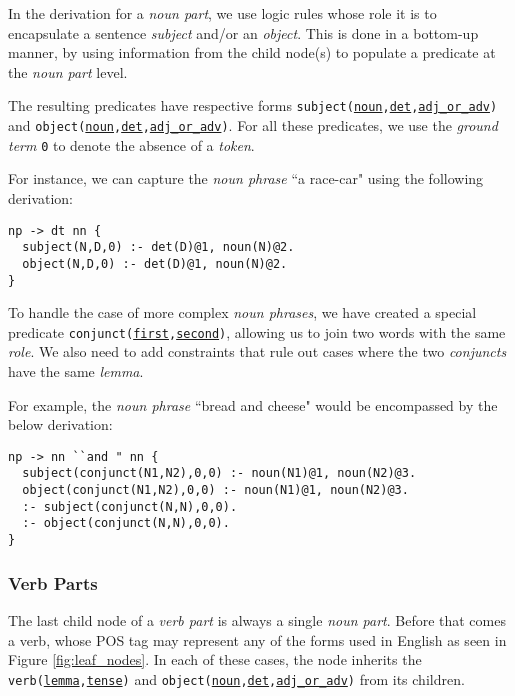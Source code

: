 In the derivation for a \textit{noun part}, we use logic rules whose role it is to encapsulate a sentence \textit{subject} and/or an \textit{object}. This is done in a bottom-up manner, by using information from the child node(s) to populate a predicate at the \textit{noun part} level.

The resulting predicates have respective forms \texttt{subject(\underline{noun},\underline{det},\underline{adj\_or\_adv})} and \texttt{object(\underline{noun},\underline{det},\underline{adj\_or\_adv})}. For all these predicates, we use the \textit{ground term} \texttt{0} to denote the absence of a \textit{token}.

For instance, we can capture the \textit{noun phrase} ``a race-car" using the following derivation:

\begin{displayquote}
\begin{lstlisting}
np -> dt nn {
  subject(N,D,0) :- det(D)@1, noun(N)@2.
  object(N,D,0) :- det(D)@1, noun(N)@2.
}
\end{lstlisting}
\end{displayquote}

To handle the case of more complex \textit{noun phrases}, we have created a special predicate \texttt{conjunct(\underline{first},\underline{second})}, allowing us to join two words with the same \textit{role}. We also need to add constraints that rule out cases where the two \textit{conjuncts} have the same \textit{lemma}.

For example, the \textit{noun phrase} ``bread and cheese" would be encompassed by the below derivation:

\begin{displayquote}
\begin{lstlisting}
np -> nn ``and " nn {
  subject(conjunct(N1,N2),0,0) :- noun(N1)@1, noun(N2)@3.
  object(conjunct(N1,N2),0,0) :- noun(N1)@1, noun(N2)@3.
  :- subject(conjunct(N,N),0,0).
  :- object(conjunct(N,N),0,0).
}
\end{lstlisting}
\end{displayquote}

\subsubsection{Verb Parts}

The last child node of a \textit{verb part} is always a single \textit{noun part}. Before that comes a verb, whose POS tag may represent any of the forms used in English as seen in Figure \ref{fig:leaf_nodes}. In each of these cases, the node inherits the \texttt{verb(\underline{lemma},\underline{tense})} and \texttt{object(\underline{noun},\underline{det},\underline{adj\_or\_adv})} from its children.

